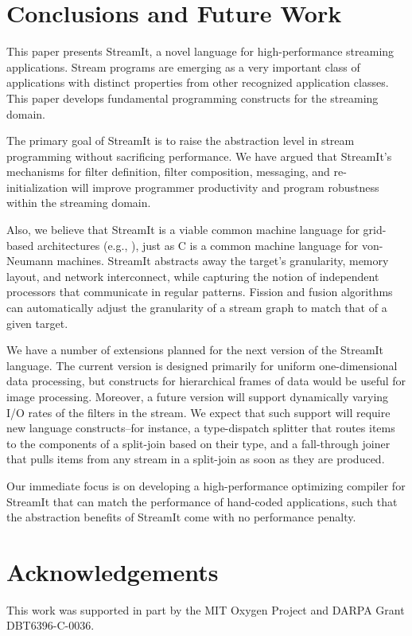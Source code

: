 \section{Conclusions and Future Work}
\label{sec:conc}

This paper presents StreamIt, a novel language for high-performance
streaming applications.  Stream programs are emerging as a very
important class of applications with distinct properties from other
recognized application classes.  This paper develops fundamental
programming constructs for the streaming domain.

The primary goal of StreamIt is to raise the abstraction level in
stream programming without sacrificing performance.  We have argued
that StreamIt's mechanisms for filter definition, filter composition,
messaging, and re-initialization will improve programmer productivity
and program robustness within the streaming domain.

Also, we believe that StreamIt is a viable common machine language for
grid-based architectures (e.g., \cite{smartmemories,rawshort,trips}),
just as C is a common machine language for von-Neumann machines.
StreamIt abstracts away the target's granularity, memory layout, and
network interconnect, while capturing the notion of independent
processors that communicate in regular patterns.  Fission and fusion
algorithms can automatically adjust the granularity of a stream graph
to match that of a given target.

We have a number of extensions planned for the next version of the
StreamIt language.  The current version is designed primarily for
uniform one-dimensional data processing, but constructs for hierarchical
frames of data would be useful for image processing.  Moreover, a future
version will support dynamically varying I/O rates of the filters in the
stream.  We expect that such support will require new language
constructs--for instance, a type-dispatch splitter that routes items to
the components of a split-join based on their type, and a fall-through
joiner that pulls items from any stream in a split-join as soon as they
are produced.

Our  immediate focus  is on  developing a  high-performance optimizing
compiler  for StreamIt that  can match  the performance  of hand-coded
applications, such that the abstraction benefits of StreamIt come with
no performance penalty.

\section*{Acknowledgements}

This work was supported in part by the MIT Oxygen Project and DARPA
Grant DBT6396-C-0036.
